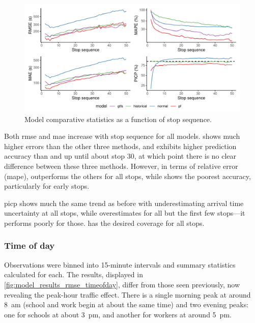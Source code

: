 \begin{knitrout}\small
{}\color{fgcolor}\begin{figure}
\includegraphics[width=\textwidth]{figure/model_results_rmse_stopn-1} \caption[Model comparative statistics as a function of stop sequence]{Model comparative statistics as a function of stop sequence.}\label{fig:model_results_rmse_stopn}
\end{figure}


\end{knitrout}

Both \gls{rmse} and \gls{mae} increase with stop sequence for all models. \Fnorm{} shows much higher errors than the other three methods, and \Fpf{} exhibits higher prediction accuracy than \Fhist{} and \Fsched{} up until about stop 30, at which point there is no clear difference between these three methods. However, in terms of relative error (\gls{mape}), \Fpf{} outperforms the others for all stops, while \Fhist{} shows the poorest accuracy, particularly for early stops.


\Gls{picp} shows much the same trend as before with \Fpf{} underestimating arrival time uncertainty at all stops, while \Fnorm{} overestimates for all but the first few stops---it performs poorly for those. \Fhist{} has the desired coverage for all stops.


\subsubsection{Time of day}

Observations were binned into 15-minute intervals and summary statistics calculated for each. The results, displayed in \cref{fig:model_results_rmse_timeofday}, differ from those seen previously, now revealing the peak-hour traffic effect. There is a single morning peak at around 8~am (school and work begin at about the same time) and two evening peaks: one for schools at about 3~pm, and another for workers at around 5~pm.


